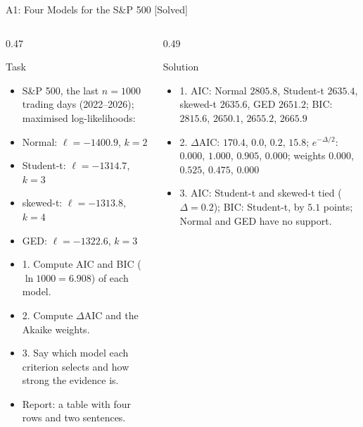 \begin{frame}{A1: Four Models for the S\&P 500 [Solved]}
\itemsize{\scriptsize}
\begin{columns}[T]
\begin{column}{0.47\textwidth}
\begin{block}{Task}
\begin{itemize}
    \item S\&P 500, the last $n = 1000$ trading days (2022--2026); maximised log-likelihoods:
    \item Normal: $\ell = -1400.9$, $k = 2$
    \item Student-t: $\ell = -1314.7$, $k = 3$
    \item skewed-t: $\ell = -1313.8$, $k = 4$
    \item GED: $\ell = -1322.6$, $k = 3$
    \item 1. Compute AIC and BIC ($\ln 1000 = 6.908$) of each model.
    \item 2. Compute $\Delta$AIC and the Akaike weights.
    \item 3. Say which model each criterion selects and how strong the evidence is.
    \item Report: a table with four rows and two sentences.
\end{itemize}
\end{block}
\end{column}
\begin{column}{0.49\textwidth}
\begin{exampleblock}{Solution}
\begin{itemize}
    \item 1. AIC: Normal $2805.8$, Student-t $2635.4$, skewed-t $2635.6$, GED $2651.2$; BIC: $2815.6$, $2650.1$, $2655.2$, $2665.9$
    \item 2. $\Delta$AIC: $170.4$, $0.0$, $0.2$, $15.8$; $e^{-\Delta/2}$: $0.000$, $1.000$, $0.905$, $0.000$; weights $0.000$, $0.525$, $0.475$, $0.000$
    \item 3. AIC: Student-t and skewed-t tied ($\Delta = 0.2$); BIC: Student-t, by $5.1$ points; Normal and GED have no support.
\end{itemize}
\end{exampleblock}
\end{column}
\end{columns}
\end{frame}

